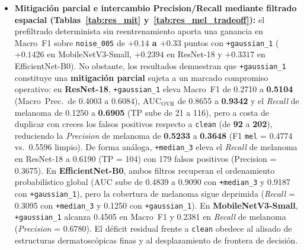 \begin{itemize}[leftmargin=1.4em,itemsep=3pt]
\item \textbf{Mitigación parcial e intercambio Precision/Recall mediante filtrado espacial (Tablas~\ref{tab:res_mit} y~\ref{tab:res_mel_tradeoff}):} el prefiltrado determinista sin reentrenamiento aporta una ganancia en Macro~F1 sobre \texttt{noise\_005} de \textbf{$+0.14$ a $+0.33$} puntos con \texttt{+gaussian\_1} ($+0.1426$ en MobileNetV3-Small, $+0.2394$ en ResNet-18 y $+0.3317$ en EfficientNet-B0). No obstante, los resultados demuestran que \texttt{+gaussian\_1} constituye una \textbf{mitigación parcial} sujeta a un marcado compromiso operativo: en \textbf{ResNet-18}, \texttt{+gaussian\_1} eleva Macro~F1 de 0.2710 a \textbf{0.5104} (Macro~Prec.\ de 0.4003 a 0.6084), $\mathrm{AUC}_{\mathrm{OVR}}$ de 0.8655 a \textbf{0.9342} y el \textit{Recall} de melanoma de 0.1250 a \textbf{0.6905} (TP sube de 21 a 116), pero a costa de duplicar con creces los falsos positivos respecto a \texttt{clean} (de \textbf{92} a \textbf{202}), reduciendo la \textit{Precision} de melanoma de \textbf{0.5233} a \textbf{0.3648} (F1 \texttt{mel} = 0.4774 vs.\ 0.5596 limpio). De forma análoga, \texttt{+median\_3} eleva el \textit{Recall} de melanoma en ResNet-18 a 0.6190 (TP = 104) con 179 falsos positivos (Precision = 0.3675). En \textbf{EfficientNet-B0}, ambos filtros recuperan el ordenamiento probabilístico global ($\mathrm{AUC}$ sube de 0.4839 a 0.9090 con \texttt{+median\_3} y 0.9187 con \texttt{+gaussian\_1}), pero la cobertura de melanoma sigue deprimida (\textit{Recall} = 0.3095 con \texttt{+median\_3} y 0.1250 con \texttt{+gaussian\_1}). En \textbf{MobileNetV3-Small}, \texttt{+gaussian\_1} alcanza 0.4505 en Macro~F1 y 0.2381 en \textit{Recall} de melanoma (\textit{Precision} = 0.6780). El déficit residual frente a \texttt{clean} obedece al alisado de estructuras dermatoscópicas finas y al desplazamiento de frontera de decisión.
\end{itemize}

\FloatBarrier
